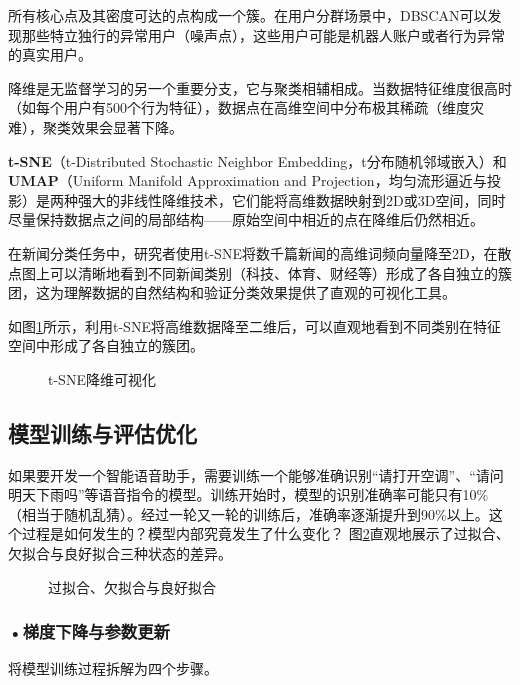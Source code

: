 所有核心点及其密度可达的点构成一个簇。在用户分群场景中，DBSCAN可以发现那些特立独行的异常用户（噪声点），这些用户可能是机器人账户或者行为异常的真实用户。

降维是无监督学习的另一个重要分支，它与聚类相辅相成。当数据特征维度很高时（如每个用户有500个行为特征），数据点在高维空间中分布极其稀疏（维度灾难），聚类效果会显著下降。

\textbf{t-SNE}（t-Distributed Stochastic Neighbor Embedding，t分布随机邻域嵌入）和\textbf{UMAP}（Uniform Manifold Approximation and Projection，均匀流形逼近与投影）是两种强大的非线性降维技术，它们能将高维数据映射到2D或3D空间，同时尽量保持数据点之间的局部结构——原始空间中相近的点在降维后仍然相近。

在新闻分类任务中，研究者使用t-SNE将数千篇新闻的高维词频向量降至2D，在散点图上可以清晰地看到不同新闻类别（科技、体育、财经等）形成了各自独立的簇团，这为理解数据的自然结构和验证分类效果提供了直观的可视化工具。

如图\ref{fig:ch2_2_5}所示，利用t-SNE将高维数据降至二维后，可以直观地看到不同类别在特征空间中形成了各自独立的簇团。

\begin{figure}[htbp]
\centering
{}
\caption{t-SNE降维可视化}
\label{fig:ch2_2_5}
\end{figure}






\subsection{模型训练与评估优化}
如果要开发一个智能语音助手，需要训练一个能够准确识别“请打开空调”、“请问明天下雨吗”等语音指令的模型。训练开始时，模型的识别准确率可能只有10\%（相当于随机乱猜）。经过一轮又一轮的训练后，准确率逐渐提升到90\%以上。这个过程是如何发生的？模型内部究竟发生了什么变化？
图\ref{fig:ch2_2_6}直观地展示了过拟合、欠拟合与良好拟合三种状态的差异。

\begin{figure}[htbp]
\centering
{}
\caption{过拟合、欠拟合与良好拟合}
\label{fig:ch2_2_6}
\end{figure}


\subsubsection*{\textbf{•梯度下降与参数更新}}

将模型训练过程拆解为四个步骤。

